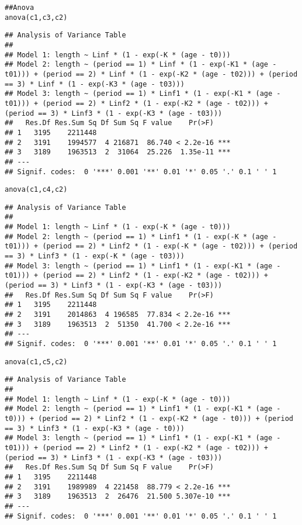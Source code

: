 \documentclass[12pt,oneside,a4paper]{article}\usepackage[]{graphicx}\usepackage[]{xcolor}
\makeatletter
\newcommand{\hlcom}[1]{\textcolor[rgb]{0.443,0.478,0.702}{#1}}%
\newcommand{\hlstd}[1]{\textcolor[rgb]{0,0,0}{#1}}%
\newcommand{\hlkwd}[1]{\textcolor[rgb]{0,0,0}{#1}}%
\newenvironment{kframe}{%
 \def\at@end@of@kframe{}%
 \ifinner\ifhmode%
  \def\at@end@of@kframe{\end{minipage}}%
  \begin{minipage}{\columnwidth}%
 \fi\fi%
 \def\FrameCommand##1{\hskip\@totalleftmargin \hskip-\fboxsep
 \colorbox{shadecolor}{##1}\hskip-\fboxsep
     \hskip-\linewidth \hskip-\@totalleftmargin \hskip\columnwidth}%
 \MakeFramed {\advance\hsize-\width
   \@totalleftmargin\z@ \linewidth\hsize
   \@setminipage}}%
 {\par\unskip\endMakeFramed%
 \at@end@of@kframe}
\newenvironment{knitrout}{}{} %
\makeatother
\begin{document}
\begin{knitrout}
\begin{kframe}
\begin{alltt}
\hlcom{## Anova}
\hlkwd{anova}\hlstd{(c1, c3, c2)}
\end{alltt}
\begin{verbatim}
## Analysis of Variance Table
## 
## Model 1: length ~ Linf * (1 - exp(-K * (age - t0)))
## Model 2: length ~ (period == 1) * Linf * (1 - exp(-K1 * (age - t01))) + (period == 2) * Linf * (1 - exp(-K2 * (age - t02))) + (period == 3) * Linf * (1 - exp(-K3 * (age - t03)))
## Model 3: length ~ (period == 1) * Linf1 * (1 - exp(-K1 * (age - t01))) + (period == 2) * Linf2 * (1 - exp(-K2 * (age - t02))) + (period == 3) * Linf3 * (1 - exp(-K3 * (age - t03)))
##   Res.Df Res.Sum Sq Df Sum Sq F value    Pr(>F)    
## 1   3195    2211448                                
## 2   3191    1994577  4 216871  86.740 < 2.2e-16 ***
## 3   3189    1963513  2  31064  25.226  1.35e-11 ***
## ---
## Signif. codes:  0 '***' 0.001 '**' 0.01 '*' 0.05 '.' 0.1 ' ' 1
\end{verbatim}
\begin{alltt}
\hlkwd{anova}\hlstd{(c1, c4, c2)}
\end{alltt}
\begin{verbatim}
## Analysis of Variance Table
## 
## Model 1: length ~ Linf * (1 - exp(-K * (age - t0)))
## Model 2: length ~ (period == 1) * Linf1 * (1 - exp(-K * (age - t01))) + (period == 2) * Linf2 * (1 - exp(-K * (age - t02))) + (period == 3) * Linf3 * (1 - exp(-K * (age - t03)))
## Model 3: length ~ (period == 1) * Linf1 * (1 - exp(-K1 * (age - t01))) + (period == 2) * Linf2 * (1 - exp(-K2 * (age - t02))) + (period == 3) * Linf3 * (1 - exp(-K3 * (age - t03)))
##   Res.Df Res.Sum Sq Df Sum Sq F value    Pr(>F)    
## 1   3195    2211448                                
## 2   3191    2014863  4 196585  77.834 < 2.2e-16 ***
## 3   3189    1963513  2  51350  41.700 < 2.2e-16 ***
## ---
## Signif. codes:  0 '***' 0.001 '**' 0.01 '*' 0.05 '.' 0.1 ' ' 1
\end{verbatim}
\begin{alltt}
\hlkwd{anova}\hlstd{(c1, c5, c2)}
\end{alltt}
\begin{verbatim}
## Analysis of Variance Table
## 
## Model 1: length ~ Linf * (1 - exp(-K * (age - t0)))
## Model 2: length ~ (period == 1) * Linf1 * (1 - exp(-K1 * (age - t0))) + (period == 2) * Linf2 * (1 - exp(-K2 * (age - t0))) + (period == 3) * Linf3 * (1 - exp(-K3 * (age - t0)))
## Model 3: length ~ (period == 1) * Linf1 * (1 - exp(-K1 * (age - t01))) + (period == 2) * Linf2 * (1 - exp(-K2 * (age - t02))) + (period == 3) * Linf3 * (1 - exp(-K3 * (age - t03)))
##   Res.Df Res.Sum Sq Df Sum Sq F value    Pr(>F)    
## 1   3195    2211448                                
## 2   3191    1989989  4 221458  88.779 < 2.2e-16 ***
## 3   3189    1963513  2  26476  21.500 5.307e-10 ***
## ---
## Signif. codes:  0 '***' 0.001 '**' 0.01 '*' 0.05 '.' 0.1 ' ' 1
\end{verbatim}
\end{kframe}
\end{knitrout}
\end{document}

